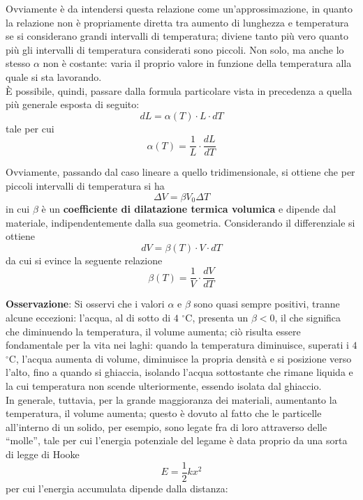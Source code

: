 \documentclass[a4paper]{extarticle}
\newcommand{\quotes}[1]{``#1''}
\begin{document}
\vspace{1em}
\noindent
Ovviamente è da intendersi questa relazione come un'approssimazione, in quanto la relazione non è propriamente diretta tra aumento di lunghezza e temperatura se si considerano grandi intervalli di temperatura; diviene tanto più vero quanto più gli intervalli di temperatura considerati sono piccoli. Non solo, ma anche lo stesso $\alpha$ non è costante: varia il proprio valore in funzione della temperatura alla quale si sta lavorando.\\
È possibile, quindi, passare dalla formula particolare vista in precedenza a quella più generale esposta di seguito:
\[\boxed{d L = \alpha(T) \cdot L \cdot dT}\]
tale per cui
\[\boxed{\alpha(T) = \frac{1}{L} \cdot \frac{dL}{dT}}\]

\vspace{1em}
\noindent
Ovviamente, passando dal caso lineare a quello tridimensionale, si ottiene che per piccoli intervalli di temperatura si ha
\[\boxed{\Delta V = \beta V_0 \Delta T}\]
in cui $\beta$ è un \textbf{coefficiente di dilatazione termica volumica} e dipende dal materiale, indipendentemente dalla sua geometria. Considerando il differenziale si ottiene
\[\boxed{dV = \beta(T) \cdot V \cdot dT}\]
da cui si evince la seguente relazione
\[\boxed{\beta(T) = \frac{1}{V} \cdot \frac{dV}{dT}}\]

\vspace{1em}
\noindent
\textbf{Osservazione}: Si osservi che i valori $\alpha$ e $\beta$ sono quasi sempre positivi, tranne alcune eccezioni: l'acqua, al di sotto di $4$ $^\circ$C, presenta un $\beta < 0$, il che significa che diminuendo la temperatura, il volume aumenta; ciò risulta essere fondamentale per la vita nei laghi: quando la temperatura diminuisce, superati i $4$ $^\circ$C, l'acqua aumenta di volume, diminuisce la propria densità e si posizione verso l'alto, fino a quando si ghiaccia, isolando l'acqua sottostante che rimane liquida e la cui temperatura non scende ulteriormente, essendo isolata dal ghiaccio.\\
In generale, tuttavia, per la grande maggioranza dei materiali, aumentanto la temperatura, il volume aumenta; questo è dovuto al fatto che le particelle all'interno di un solido, per esempio, sono legate fra di loro attraverso delle \quotes{molle}, tale per cui l'energia potenziale del legame è data proprio da una sorta di legge di Hooke
\[E=\frac{1}{2}kx^2\]
per cui l'energia accumulata dipende dalla distanza:
\end{document}
